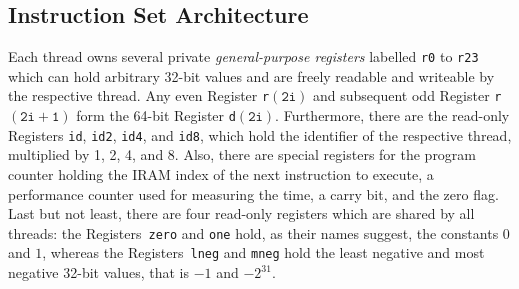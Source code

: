 \subsection{Instruction Set Architecture}
\label{sec:prereq:arch:isa}

Each thread owns several private \emph{general-purpose registers} labelled \lstinline|r0| to \lstinline|r23| which can hold arbitrary 32-bit values and are freely readable and writeable by the respective thread.
Any even Register \lstinline|r|\(\mathtt{(2i)}\) and subsequent odd Register \lstinline|r|\(\mathtt{(2i+1)}\) form the 64-bit Register \lstinline|d|\(\mathtt{(2i)}\).
Furthermore, there are the read-only Registers \lstinline|id|, \lstinline|id2|, \lstinline|id4|, and \lstinline|id8|, which hold the identifier of the respective thread, multiplied by 1, 2, 4, and 8.
Also, there are special registers for the program counter holding the \ac{IRAM} index of the next instruction to execute, a performance counter used for measuring the time, a carry bit, and the zero flag.
Last but not least, there are four read-only registers which are shared by all threads:
the Registers~\lstinline|zero| and \lstinline|one| hold, as their names suggest, the constants \(0\) and \(1\), whereas the Registers~\lstinline|lneg| and \lstinline|mneg| hold the least negative and most negative 32-bit values, that is \(-1\) and \(-2^{31}\).

